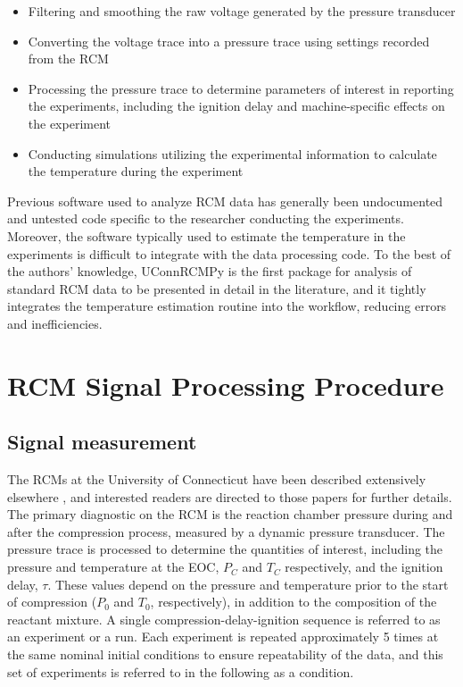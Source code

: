 \documentclass[12pt]{../ussci}
\begin{document}
\begin{itemize}
\item
  Filtering and smoothing the raw voltage generated by the pressure
  transducer
\item
  Converting the voltage trace into a pressure trace using settings
  recorded from the RCM
\item
  Processing the pressure trace to determine parameters of interest in
  reporting the experiments, including the ignition delay and
  machine-specific effects on the experiment
\item
  Conducting simulations utilizing the experimental information to
  calculate the temperature during the experiment
\end{itemize}

Previous software used to analyze RCM data has generally been
undocumented and untested code specific to the researcher conducting the
experiments. Moreover, the software typically used to estimate the
temperature in the experiments is difficult to integrate with the data
processing code. To the best of the authors' knowledge, UConnRCMPy is
the first package for analysis of standard RCM data to be presented in
detail in the literature, and it tightly integrates the temperature
estimation routine into the workflow, reducing errors and
inefficiencies.

\section{RCM Signal Processing Procedure}\label{rcm-signal-processing-procedure}

\subsection{Signal measurement}\label{signal-measurement}

The RCMs at the University of Connecticut have been described extensively
elsewhere \autocite{Das2012,Mittal2007a}, and interested readers are directed to
those papers for further details. The primary diagnostic on the RCM is the
reaction chamber pressure during and after the compression process, measured by
a dynamic pressure transducer. The pressure trace is processed to determine the
quantities of interest, including the pressure and temperature at the EOC,
\(P_C\) and \(T_C\) respectively, and the ignition delay, \(\tau\). These values
depend on the pressure and temperature prior to the start of compression
(\(P_0\) and \(T_0\), respectively), in addition to the composition of the
reactant mixture. A single compression-delay-ignition sequence is
referred to as an experiment or a run. Each experiment is repeated
approximately 5 times at the same nominal initial conditions to ensure
repeatability of the data, and this set of experiments is referred to in
the following as a condition.
\end{document}
